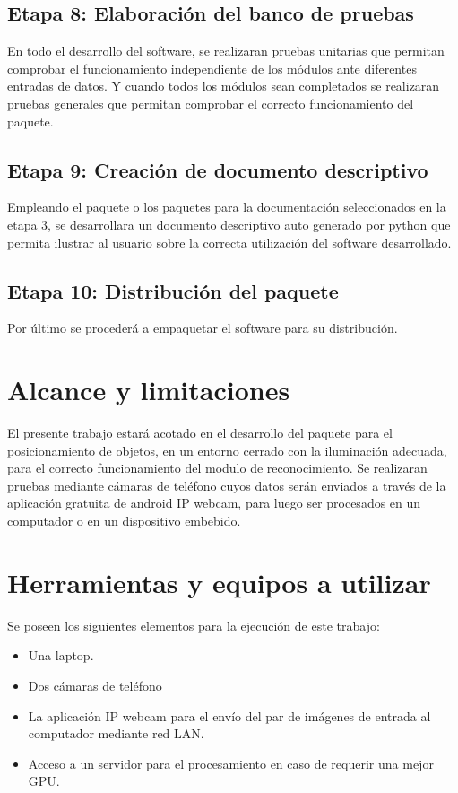 \documentclass[letterpaper,titlepage,12pt,oneside,spanish,final]{report_eie}
\numberwithin{equation}{chapter}%
\numberwithin{figure}{chapter}%
\numberwithin{table}{chapter}%
\numberwithin{definition}{chapter}%
\numberwithin{lemma}{chapter}%
\numberwithin{theorem}{chapter}%
\numberwithin{corollary}{chapter}%
\numberwithin{condition}{chapter}%
\numberwithin{criterion}{chapter}%
\numberwithin{problem}{chapter}%
\numberwithin{property}{chapter}%
\numberwithin{proposition}{chapter}%
\numberwithin{solution}{chapter}%
\numberwithin{conjecture}{chapter}%
\begin{document}
\subsection*{Etapa 8: Elaboración del banco de pruebas}
En todo el desarrollo del software, se realizaran pruebas unitarias que permitan comprobar el funcionamiento independiente de los módulos ante diferentes entradas de datos. Y cuando todos los módulos sean completados se realizaran pruebas generales que permitan comprobar el correcto funcionamiento del paquete.
\subsection*{Etapa 9: Creación de documento descriptivo}
Empleando el paquete o los paquetes para la documentación seleccionados en la etapa 3, se desarrollara un documento descriptivo auto generado por python que permita ilustrar al usuario sobre la correcta utilización del software desarrollado. 
\subsection*{Etapa 10: Distribución del paquete}
Por último se procederá a empaquetar el software para su distribución.
\section*{Alcance y limitaciones}
El presente trabajo estará acotado en el desarrollo del paquete para el posicionamiento de objetos, en un entorno cerrado con la iluminación adecuada, para el correcto funcionamiento del modulo de reconocimiento. Se realizaran pruebas mediante cámaras de teléfono cuyos datos serán enviados a través de la aplicación gratuita de android IP webcam, para luego ser procesados en un computador o en un dispositivo embebido.
\section*{Herramientas y equipos a utilizar}
Se poseen los siguientes elementos para la ejecución de este trabajo:
\begin{itemize}
    \item Una laptop.
    \item Dos cámaras de teléfono
    \item La aplicación IP webcam para el envío del par de imágenes de entrada al computador mediante red LAN.
    \item Acceso a un servidor para el procesamiento en caso de requerir una mejor GPU.
\end{itemize}
\end{document}
